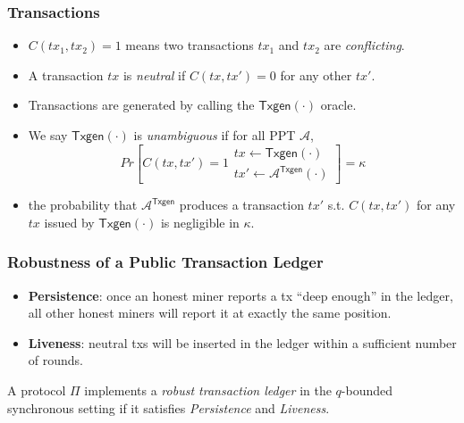 \documentclass{beamer}
\begin{document}
\begin{frame}
\frametitle{Transactions}

\begin{itemize}
    \item $C(tx_1, tx_2) = 1$ means two transactions $tx_1$ and $tx_2$ are \emph{conflicting}.
    \item A transaction $tx$ is \emph{neutral} if $C(tx, tx') = 0$ for any other $tx'$.
    \item Transactions are generated by calling the $\mathsf{Txgen}(\cdot)$ oracle.
    \item We say $\mathsf{Txgen}(\cdot)$ is \emph{unambiguous} if for all PPT $\mathcal{A}$,
        \[
            Pr \left[ C(tx, tx') = 1
            \begin{array}{|c}
                tx \gets \mathsf{Txgen}(\cdot)\\
                tx' \gets \mathcal{A}^{\mathsf{Txgen}}(\cdot)
            \end{array}
            \right] = \kappa
        \]
    \item the probability that $\mathcal{A}^{\mathsf{Txgen}}$ produces a transaction $tx'$ s.t. $C(tx, tx')$ for any $tx$ issued by $\mathsf{Txgen}(\cdot)$ is negligible in $\kappa$.
\end{itemize}

\end{frame}


\begin{frame}
\frametitle{Robustness of a Public Transaction Ledger}

\begin{itemize}
    \item \textbf{Persistence}: once an honest miner reports a tx ``deep enough'' in the ledger, all other honest miners will report it at exactly the same position.
    \item \textbf{Liveness}: neutral txs will be inserted in the ledger within a sufficient number of rounds.
\end{itemize}

\begin{definition}
    A protocol $\Pi$ implements a \emph{robust transaction ledger} in the $q$-bounded synchronous setting if it satisfies \emph{Persistence} and \emph{Liveness}.
\end{definition}

\end{frame}
\end{document}
